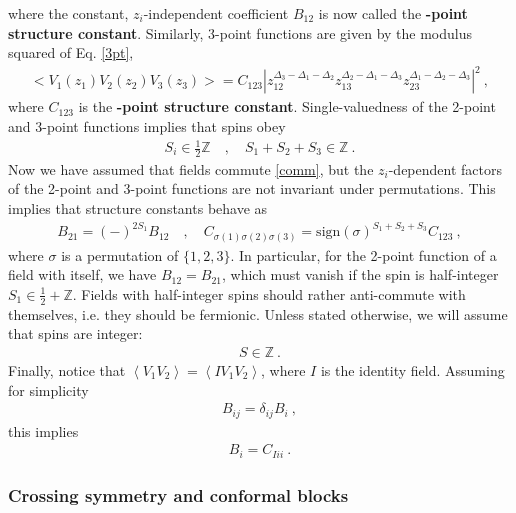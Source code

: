 \documentclass[12pt, a4paper]{article}
\newcommand{\myindex}[1]{\textbf{\boldmath #1}}
\theoremstyle{break}
\begin{document}
where the constant, $z_i$-independent coefficient $B_{12}$ is now called the \myindex{2-point structure constant}. Similarly, 3-point functions are given by the modulus squared of Eq. \eqref{3pt},
\begin{align}
 \boxed{  \Big< V_1(z_1)V_2(z_2)V_3(z_3) \Big> = C_{123} \left|z_{12}^{\Delta_3-\Delta_1-\Delta_2} z_{13}^{\Delta_2-\Delta_1-\Delta_3} z_{23}^{\Delta_1-\Delta_2-\Delta_3}\right|^2 }\ ,
 \label{3ptc}
\end{align}
where $C_{123}$ is the \myindex{3-point structure constant}. Single-valuedness of the 2-point and 3-point functions implies that spins obey
\begin{align}
 S_i\in\frac12 \mathbb{Z} \quad , \quad S_1+S_2+S_3 \in\mathbb{Z}\ . 
 \label{sihz}
\end{align}
Now we have assumed that fields commute \eqref{comm}, but the $z_i$-dependent factors of the 2-point and 3-point functions are not invariant under permutations. This implies that structure constants behave as
\begin{align}
 B_{21} = (-)^{2S_1} B_{12} \quad ,\quad C_{\sigma(1)\sigma(2)\sigma(3)} = \text{sign}(\sigma)^{S_1+S_2+S_3} C_{123}\ , 
 \label{b21}
\end{align}
where $\sigma$ is a permutation of $\{1,2,3\}$. In particular, for the 2-point function of a field with itself, we have $B_{12}=B_{21}$, which must vanish if the spin is half-integer $S_1\in \frac12+\mathbb{Z}$. Fields with half-integer spins should rather anti-commute with themselves, i.e. they should be fermionic. 
Unless stated otherwise, we will assume that spins are integer:
\begin{align}
 \boxed{S\in \mathbb{Z}}\ .
 \label{siz}
\end{align}
Finally, notice that $\left<V_1V_2\right> = \left<IV_1V_2\right>$, where $I$ is the identity field. Assuming for simplicity
\begin{align}
 B_{ij}=\delta_{ij}B_i\ ,
\end{align}
this implies 
\begin{align}
 \boxed{B_i = C_{Iii}}\ .
 \label{bicii}
\end{align}


\subsubsection{Crossing symmetry and conformal blocks}\label{sec:cscb}
\end{document}
